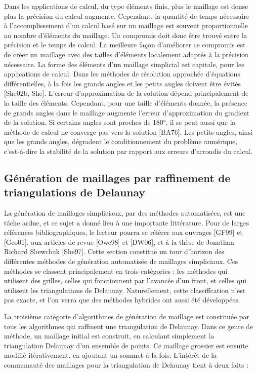 {Dans les applications de calcul, du type éléments finis, plus le maillage est dense plus la précision du calcul augmente. Cependant, la quantité de temps nécessaire à l'accomplissement d'un calcul basé sur un maillage est souvent proportionnelle au nombre d'éléments du maillage. Un compromis doit donc être trouvé entre la précision et le temps de calcul. La meilleure façon d'améliorer ce compromis est de créer un maillage avec des tailles d'éléments localement adaptés à la précision nécessaire. La forme des éléments d'un maillage simplicial est capitale, pour les applications de calcul. Dans les méthodes de résolution approchée d'équations différentielles, à la fois les grands angles et les petits angles doivent être évités [She02b, She]. L'erreur d'approximation de la solution dépend principalement de la taille des éléments. Cependant, pour une taille d'éléments donnée, la présence de grands angles dans le maillage augmente l'erreur d'approximation du gradient de la solution. Si certains angles sont proches de 180°, il se peut aussi que la méthode de calcul ne converge pas vers la solution [BA76]. Les petits angles, ainsi que les grands angles, dégradent le conditionnement du problème numérique, c'est-à-dire la stabilité de la solution par rapport aux erreurs d'arrondis du calcul. 

\subsection{G\'en\'eration de maillages par raffinement de triangulations de Delaunay}

La génération de maillages simpliciaux, par des méthodes automatisées, est une t\^ache ardue, et ce sujet a donné lieu à une importante littérature. Pour de larges références bibliographiques, le lecteur pourra se référer aux ouvrages [GF99] et [Geo01], aux articles de revue [Owe98] et [DW06], et à la thèse de Jonathan Richard Shewchuk [She97]. Cette section constitue un tour d'horizon des différentes méthodes de génération automatisée de maillages simpliciaux. Ces méthodes se classent principalement en trois catégories : les méthodes qui utilisent des grilles, celles qui fonctionnent par l'avancée d'un front, et celles qui utilisent les triangulations de Delaunay. Naturellement, cette classiffcation n'est pas exacte, et l'on verra que des méthodes hybrides ont aussi été développées.

La troisième catégorie d'algorithmes de génération de maillage est constituée par tous les algorithmes qui raffinent une triangulation de Delaunay. Dans ce genre de méthode, un maillage initial est construit, en calculant simplement la triangulation Delaunay d'un ensemble de points. Ce maillage grossier est ensuite modifié itérativement, en ajoutant un sommet à la fois. L'intérêt de la communauté des maillages pour la triangulation de Delaunay tient à deux faits :
 
}
